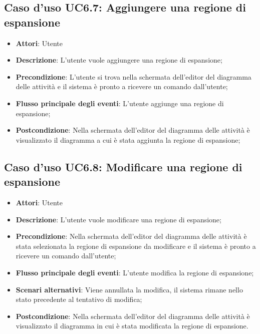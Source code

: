 \documentclass[../AnalisiDeiRequisiti.tex]{subfiles}
\begin{document}
				\subsection{Caso d'uso UC6.7: Aggiungere una regione di espansione}
				\begin{itemize}
					\item \textbf{Attori}: Utente
					\item \textbf{Descrizione}: L'utente vuole aggiungere una regione di espansione;
					\item \textbf{Precondizione}: L'utente si trova nella schermata dell'editor del diagramma delle attività e il sistema è pronto a ricevere un comando dall'utente;
					\item \textbf{Flusso principale degli eventi}: L'utente aggiunge una regione di espansione;
					\item \textbf{Postcondizione}: Nella schermata dell'editor del diagramma delle attività è visualizzato il diagramma a cui è stata aggiunta la regione di espansione;
				\end{itemize}
				\subsection{Caso d'uso UC6.8: Modificare una regione di espansione}
				\begin{itemize}
					\item \textbf{Attori}: Utente
					\item \textbf{Descrizione}: L'utente vuole modificare una regione di espansione;
					\item \textbf{Precondizione}: Nella schermata dell'editor del diagramma delle attività è stata selezionata la regione di espansione da modificare e il sistema è pronto a ricevere un comando dall'utente;
					\item \textbf{Flusso principale degli eventi}: L'utente modifica la regione di espansione;
					\item \textbf{Scenari alternativi}: Viene annullata la modifica, il sistema rimane nello stato precedente al tentativo di modifica;
					\item \textbf{Postcondizione}: Nella schermata dell'editor del diagramma delle attività è visualizzato il diagramma in cui è stata modificata la regione di espansione.
				\end{itemize}
\end{document}
